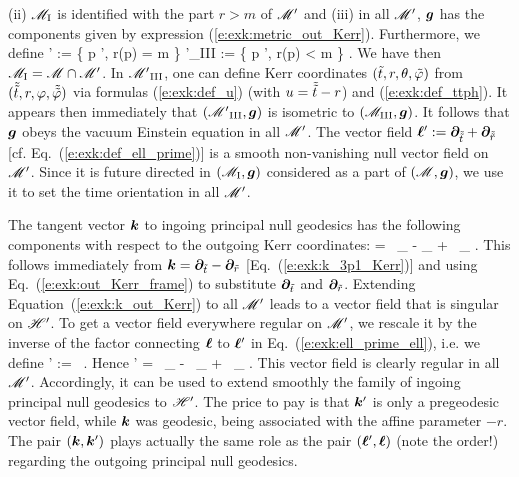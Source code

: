 \ee
(ii) $\mathscr{M}_{\rm I}$ is identified with the part $r>m$ of $\mathscr{M}'$ and
(iii) in all $\mathscr{M}'$, $\bm{g}$ has the components given by expression
(\ref{e:exk:metric_out_Kerr}). Furthermore, we define
\be
    \Hor' := \left\{ p \in \M', \quad r(p) = m \right\}
    \qand
    {\M'}_{\rm III} := \left\{ p \in \M', \quad r(p) < m \right\} .
\ee
We have then $\mathscr{M}_{\rm I} = \mathscr{M} \cap \mathscr{M}'$.
In ${\mathscr{M}'}_{\rm III}$, one can define Kerr coordinates $({\tilde t},r,\theta,{\tilde\varphi})$
from $(\tilde{{\tilde t}},r,\varphi,\tilde{{\tilde\varphi}})$
via formulas (\ref{e:exk:def_u}) (with $u = \tilde{{\tilde t}} - r$) and (\ref{e:exk:def_ttph}).
It appears then immediately that $({\mathscr{M}'}_{\rm III}, \bm{g})$ is isometric to $(\mathscr{M}_{\rm III},\bm{g})$.
It follows that $\bm{g}$ obeys the vacuum Einstein equation in all $\mathscr{M}'$.
The vector field $\bm{\ell}' := \bm{\partial}_{\tilde{{\tilde t}}} + \bm{\partial}_{\tilde{\tilde{r}}}$
[cf. Eq.~(\ref{e:exk:def_ell_prime})] is a smooth non-vanishing null vector
field on $\mathscr{M}'$. Since it is future directed in $(\mathscr{M}_{\rm I},\bm{g})$
considered as a part of $(\mathscr{M},\bm{g})$,
we use it to set the time orientation in all $\mathscr{M}'$.

The tangent vector $\bm{k}$ to ingoing principal null geodesics has
the following components with respect to the outgoing Kerr coordinates:
\be \label{e:exk:k_out_Kerr}
     =  \, \wpar_{\tilde{\ti}}
    - \wpar_{} +  \, \wpar_{\tilde{\tph}} .
\ee
This follows immediately from
$\bm{k} = \bm{\partial}_{{\tilde t}} - \bm{\partial}_{\tilde{r}}$ [Eq.~(\ref{e:exk:k_3p1_Kerr})]
and using Eq.~(\ref{e:exk:out_Kerr_frame})
to substitute $\bm{\partial}_{{\tilde t}}$ and $\bm{\partial}_{\tilde{r}}$.
Extending Equation~(\ref{e:exk:k_out_Kerr}) to all $\mathscr{M}'$
leads to a vector field that is singular on $\mathscr{H}'$. To get a vector field
everywhere regular on $\mathscr{M}'$, we rescale it by the inverse of the factor
connecting $\bm{\ell}$ to $\bm{\ell}'$ in Eq.~(\ref{e:exk:ell_prime_ell}), i.e. we
define
\be
    ' :=  \,  .
\ee
Hence
\be \label{e:exk:k_prime_out_Kerr}
    ' =  \, \wpar_{\tilde{\ti}}
    - \, \wpar_{} +  \, \wpar_{\tilde{\tph}} .
\ee
This vector field is clearly regular in all $\mathscr{M}'$.
Accordingly, it can be used to extend smoothly the family of ingoing principal
null geodesics to $\mathscr{H}'$. The price to pay is that $\bm{k}'$ is only a pregeodesic
vector field, while $\bm{k}$ was geodesic, being associated with the affine parameter $-r$.
The pair $(\bm{k}, \bm{k}')$ plays actually the same role as the pair $(\bm{\ell}', \bm{\ell})$
(note the order!) regarding the outgoing principal null geodesics.

